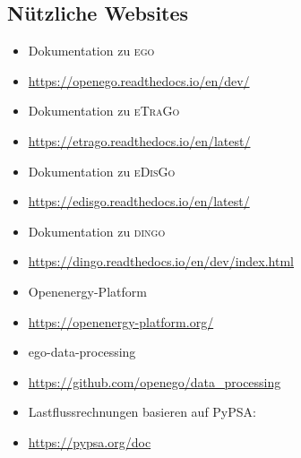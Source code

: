 \documentclass[
a4paper,     %
12pt         %
]{scrartcl}  %
\begin{document}
\subsection{Nützliche Websites}
\begin{itemize}
	\item Dokumentation zu \textsc{ego}
	\item[] \url{https://openego.readthedocs.io/en/dev/}
	\item Dokumentation zu \textsc{eTraGo}
	\item[] \url{https://etrago.readthedocs.io/en/latest/}
	\item Dokumentation zu \textsc{eDisGo}
	\item[] \url{https://edisgo.readthedocs.io/en/latest/}
	\item Dokumentation zu \textsc{dingo}
	\item[] \url{https://dingo.readthedocs.io/en/dev/index.html}
	\item Openenergy-Platform
	\item[] \url{https://openenergy-platform.org/}
	\item ego-data-processing
	\item[] \url{https://github.com/openego/data_processing}
	\item Lastflussrechnungen basieren auf PyPSA:
	\item[] \url{https://pypsa.org/doc}
\end{itemize}
	
\end{document}
